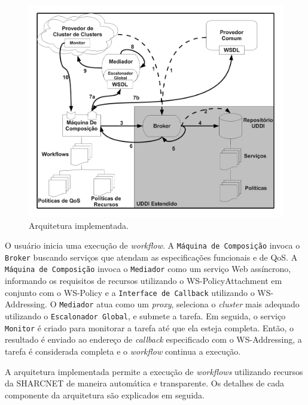 \documentclass[12pt]{report} %
\begin{document}
	    \begin{figure}[!htb]%
	    \begin{center}
		\includegraphics[scale=0.40]{imagens/execComposicaoA.pdf} 
		\caption{Arquitetura implementada.}
		\label{fig:ArqComposicaoA}
	    \end{center}
	    \end{figure}
	    
	    O usuário inicia uma execução de \textit{workflow}.
	    A \texttt{Máquina de Composição} invoca o \texttt{Broker} buscando serviços que atendam as especificações funcionais e de QoS. 
	    A \texttt{Máquina de Composição} invoca o \texttt{Mediador} como um serviço Web assíncrono, informando os requisitos de recursos utilizando o WS-PolicyAttachment em conjunto com o WS-Policy e a \texttt{Interface de Callback} utilizando o  WS-Addressing.
	    O \texttt{Mediador} atua como um \textit{proxy}, seleciona o \textit{cluster} mais adequado utilizando o \texttt{Escalonador Global}, e submete a tarefa.
	    Em seguida, o serviço \texttt{Monitor} é criado para monitorar a tarefa até que ela esteja completa.
	    Então, o resultado é enviado ao endereço de \textit{callback} especificado com o WS-Addressing, a tarefa é considerada completa e o \textit{workflow} continua a execução.	    	    

	    A arquitetura implementada permite a execução de \textit{workflows} utilizando recursos da SHARCNET de maneira automática e transparente.
	    Os detalhes de cada componente da arquitetura são explicados em seguida.	    	        
        
\end{document}
